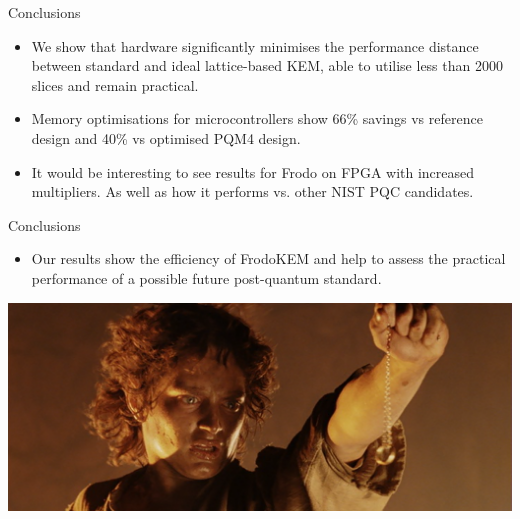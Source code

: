 \documentclass{beamer}            %
\begin{document}

\begin{frame}{Conclusions}

\begin{itemize}

\item We show that hardware significantly minimises the performance distance between standard and ideal lattice-based KEM, able to utilise less than 2000 slices and remain practical.

\item Memory optimisations for microcontrollers show 66\% savings vs reference design and 40\% vs optimised PQM4 design.

\item It would be interesting to see results for Frodo on FPGA with increased multipliers. As well as how it performs vs. other NIST PQC candidates.

\end{itemize}

\end{frame}


\begin{frame}{Conclusions}


\begin{itemize}
\item Our results show the efficiency of \textsf{FrodoKEM} and help to assess the practical performance of a possible future post-quantum standard.

\end{itemize}

\begin{center}
\includegraphics[scale=0.15]{Frodo_Doom}
\end{center}

\end{frame}
\end{document}
